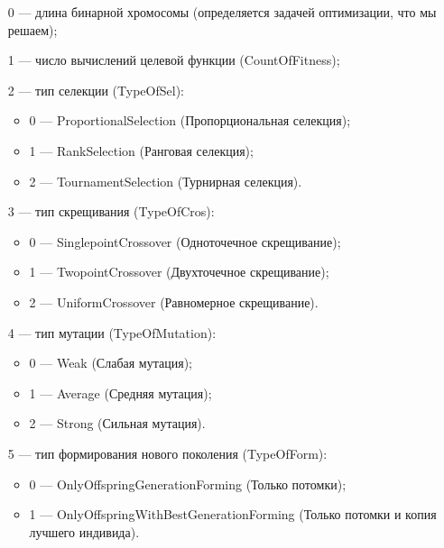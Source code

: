  \begin{itemize}
 \item [0] --- длина бинарной хромосомы (определяется задачей оптимизации, что мы решаем);
 
 \item [1] --- число вычислений целевой функции (CountOfFitness);
 
 \item [2] --- тип селекции (TypeOfSel):
 
 \begin{itemize}
       \item 0 --- ProportionalSelection (Пропорциональная селекция);
 
       \item 1 --- RankSelection (Ранговая селекция);
 
       \item 2 --- TournamentSelection (Турнирная селекция).
	    \end{itemize}
 
 \item [3] --- тип скрещивания (TypeOfCros):
  \begin{itemize}
       \item 0 --- SinglepointCrossover (Одноточечное скрещивание);
 
       \item 1 --- TwopointCrossover (Двухточечное скрещивание);
 
       \item 2 --- UniformCrossover (Равномерное скрещивание).
	    \end{itemize}
 
 \item [4] --- тип мутации (TypeOfMutation):
  \begin{itemize}
       \item 0 --- Weak (Слабая мутация);
 
       \item 1 --- Average (Средняя мутация);
 
       \item 2 --- Strong (Сильная мутация).
	    \end{itemize}
 
 \item [5] --- тип формирования нового поколения (TypeOfForm):
  \begin{itemize}
       \item 0 --- OnlyOffspringGenerationForming (Только потомки);
 
       \item 1 --- OnlyOffspringWithBestGenerationForming (Только потомки и копия лучшего индивида).
	    \end{itemize}
 \end{itemize}
 
